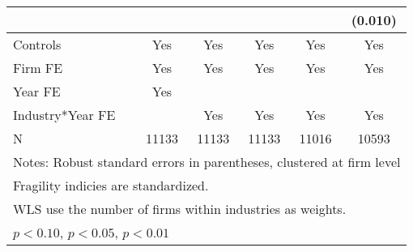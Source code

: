 \begin{table}[htbp]
\begin{tabular}{l*{5}{c}}
                    &                     &                     &                     &                     &     (0.010)         \\
\midrule
Controls            &         Yes         &         Yes         &         Yes         &         Yes         &         Yes         \\
Firm FE             &         Yes         &         Yes         &         Yes         &         Yes         &         Yes         \\
Year FE             &         Yes         &                     &                     &                     &                     \\
Industry*Year FE    &                     &         Yes         &         Yes         &         Yes         &         Yes         \\
N                   &       11133         &       11133         &       11133         &       11016         &       10593         \\
\bottomrule
\multicolumn{6}{l}{\footnotesize Notes: Robust standard errors in parentheses, clustered at firm level}\\
\multicolumn{6}{l}{\footnotesize Fragility indicies are standardized.}\\
\multicolumn{6}{l}{\footnotesize WLS use the number of firms within industries as weights.}\\
\multicolumn{6}{l}{\footnotesize \sym{*} \(p<0.10\), \sym{**} \(p<0.05\), \sym{***} \(p<0.01\)}\\
\end{tabular}
\end{table}
